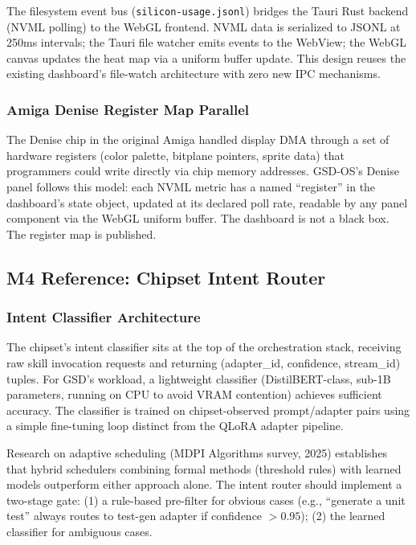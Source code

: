 \documentclass[11pt,letterpaper]{article}
\begin{document}
The filesystem event bus (\texttt{silicon-usage.jsonl}) bridges the Tauri Rust backend (NVML polling) to the WebGL frontend. NVML data is serialized to JSONL at 250ms intervals; the Tauri file watcher emits events to the WebView; the WebGL canvas updates the heat map via a uniform buffer update. This design reuses the existing dashboard's file-watch architecture with zero new IPC mechanisms.

\subsubsection{Amiga Denise Register Map Parallel}

The Denise chip in the original Amiga handled display DMA through a set of hardware registers (color palette, bitplane pointers, sprite data) that programmers could write directly via chip memory addresses. GSD-OS's Denise panel follows this model: each NVML metric has a named ``register'' in the dashboard's state object, updated at its declared poll rate, readable by any panel component via the WebGL uniform buffer. The dashboard is not a black box. The register map is published.

\subsection{M4 Reference: Chipset Intent Router}

\subsubsection{Intent Classifier Architecture}

The chipset's intent classifier sits at the top of the orchestration stack, receiving raw skill invocation requests and returning (adapter\_id, confidence, stream\_id) tuples. For GSD's workload, a lightweight classifier (DistilBERT-class, sub-1B parameters, running on CPU to avoid VRAM contention) achieves sufficient accuracy. The classifier is trained on chipset-observed prompt/adapter pairs using a simple fine-tuning loop distinct from the QLoRA adapter pipeline.

Research on adaptive scheduling (MDPI Algorithms survey, 2025) establishes that hybrid schedulers combining formal methods (threshold rules) with learned models outperform either approach alone. The intent router should implement a two-stage gate: (1) a rule-based pre-filter for obvious cases (e.g., ``generate a unit test'' always routes to test-gen adapter if confidence $> 0.95$); (2) the learned classifier for ambiguous cases.
\end{document}
